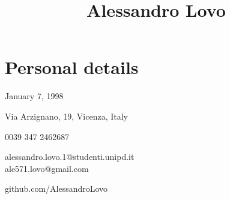 \documentclass[11pt, a4 paper]{article}
\begin{document}
\title{Alessandro Lovo}
\date{}
\author{}
\maketitle


\section*{Personal details}
  \begin{multicols}{2}
    \begin{description}[style=multiline,leftmargin=2cm,align=right]
      \item[birth] January 7, 1998
      \item[address] Via Arzignano, 19, Vicenza, Italy
      \item[phone] 0039 347 2462687
      \item[e-mail] alessandro.lovo.1@studenti.unipd.it \\
                    ale571.lovo@gmail.com
      \item[GitHub] github.com/AlessandroLovo
    \end{description}
  \end{multicols}
\end{document}

